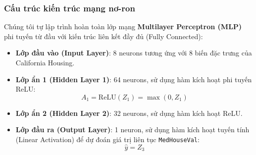 \documentclass[a4paper]{article}
\begin{document}
\subsubsection{Cấu trúc kiến trúc mạng nơ-ron}
Chúng tôi tự lập trình hoàn toàn lớp mạng \textbf{Multilayer Perceptron (MLP)} phi tuyến từ đầu với kiến trúc liên kết đầy đủ (Fully Connected):
\begin{itemize}
    \item \textbf{Lớp đầu vào (Input Layer)}: 8 neurons tương ứng với 8 biến đặc trưng của California Housing.
    \item \textbf{Lớp ẩn 1 (Hidden Layer 1)}: 64 neurons, sử dụng hàm kích hoạt phi tuyến ReLU:
    \begin{equation}
        A_1 = \text{ReLU}(Z_1) = \max(0, Z_1)
    \end{equation}
    \item \textbf{Lớp ẩn 2 (Hidden Layer 2)}: 32 neurons, sử dụng hàm kích hoạt ReLU.
    \item \textbf{Lớp đầu ra (Output Layer)}: 1 neuron, sử dụng hàm kích hoạt tuyến tính (Linear Activation) để dự đoán giá trị liên tục \texttt{MedHouseVal}:
    \begin{equation}
        \hat{y} = Z_3
    \end{equation}
\end{itemize}
\end{document}
